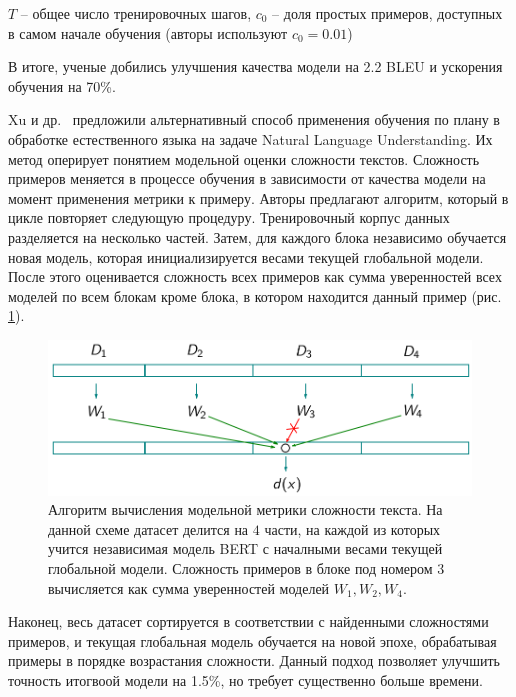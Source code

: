 \documentclass{spbau-diploma}
\begin{document}
$T$ -- общее число тренировочных шагов, $c_0$ -- доля простых примеров, доступных в самом начале обучения (авторы используют $c_0 = 0.01$)

В итоге, ученые добились улучшения качества модели на 2.2 BLEU и ускорения обучения на 70\%.

Xu и др.~\cite{xu2020curriculum} предложили альтернативный способ применения обучения по плану в обработке естественного языка на задаче Natural Language Understanding. Их метод оперирует понятием модельной оценки сложности текстов. Сложность примеров меняется в процессе обучения в зависимости от качества модели на момент применения метрики к примеру. Авторы предлагают алгоритм, который в цикле повторяет следующую процедуру. Тренировочный корпус данных разделяется на несколько частей. Затем, для каждого блока независимо обучается новая модель, которая инициализируется весами текущей глобальной модели. После этого оценивается сложность всех примеров как сумма уверенностей всех моделей по всем блокам кроме блока, в котором находится данный пример (рис. \ref{fig:acl20_algo_difficulty}).

\begin{figure}[h]
	\centering
	\includegraphics[scale=0.48]{acl20_algo_difficulty}
	\caption{Алгоритм вычисления модельной метрики сложности текста. На данной схеме датасет делится на $4$ части, на каждой из которых учится независимая модель BERT с началными весами текущей глобальной модели. Сложность примеров в блоке под номером $3$ вычисляется как сумма уверенностей моделей $W_1,W_2,W_4$.}
	\label{fig:acl20_algo_difficulty}
\end{figure}

Наконец, весь датасет сортируется в соответствии с найденными сложностями примеров, и текущая глобальная модель обучается на новой эпохе, обрабатывая примеры в порядке возрастания сложности. Данный подход позволяет улучшить точность итогвоой модели на 1.5\%, но требует существенно больше времени.
\end{document}
